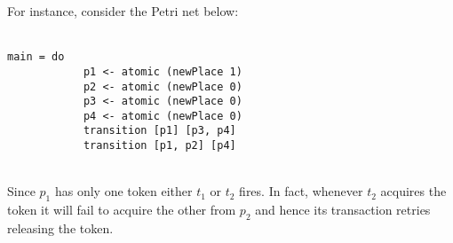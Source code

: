 For instance, consider the Petri net below:
\\\\
\noindent
\begin{BVerbatim}[tabsize=3, xleftmargin=1ex, gobble=2]
        main = do
            p1 <- atomic (newPlace 1)
            p2 <- atomic (newPlace 0)
            p3 <- atomic (newPlace 0)
            p4 <- atomic (newPlace 0)
            transition [p1] [p3, p4]
            transition [p1, p2] [p4]
\end{BVerbatim}
\hfill
\begin{minipage}[t]{.33\linewidth}
\end{minipage}
\\[1ex]
Since $p_1$ has only one token either $t_1$ or $t_2$ fires. In fact,
whenever $t_2$ acquires the token it will fail to acquire the other
from $p_2$ and hence its transaction retries releasing the token.
